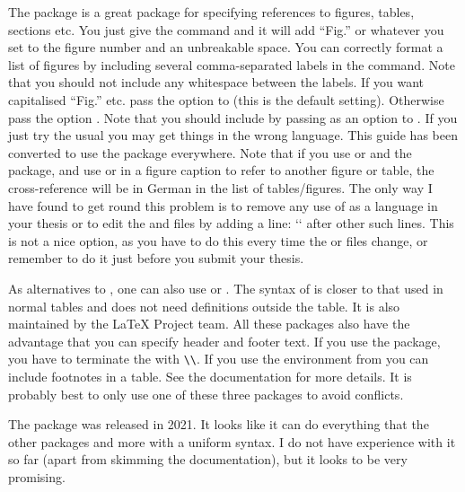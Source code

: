 The  package is a great package for specifying references to
figures, tables, sections etc.
You just give the command  and it will add \enquote{Fig.} or whatever
you set to the figure number and an unbreakable space.
You can correctly format a list of figures by including several comma-separated labels in the  command.
Note that you should not include any whitespace between the labels.
If you want capitalised \enquote{Fig.} etc. pass the option 
to  (this is the default setting).
Otherwise pass the option .
Note that you should include  by passing  
as an option to .
If you just try the usual  you may get things in the wrong language.
This guide has been converted to use the  package everywhere.
Note that if you use  or  and the  package,
and use  or  in a figure caption to refer to another figure or table,
the cross-reference will be in German in the list of tables/figures.
The only way I have found to get round this problem is to remove any use of 
as a language in your thesis or to edit the  and  files by adding a line:
`\relax` after other such lines.
This is not a nice option, as you have to do this every time the  or  files change,
or remember to do it just before you submit your thesis.

As alternatives to , one can also use
 or . 
The syntax of  is closer to that used in normal tables
and does not need definitions outside the table.
It is also maintained by the \LaTeX{} Project team.
All these packages also have the advantage that you
can specify header and footer text.
If you use the  package,
you have to terminate the  with \verb|\\|.
If you use the  environment from  
you can include footnotes in a table.
See the  documentation for more details.
It is probably best to only use one of these three packages to avoid conflicts.

The package  was released in 2021.
It looks like it can do everything that the other packages and more with a uniform syntax.
I do not have experience with it so far (apart from skimming the documentation),
but it looks to be very promising.

